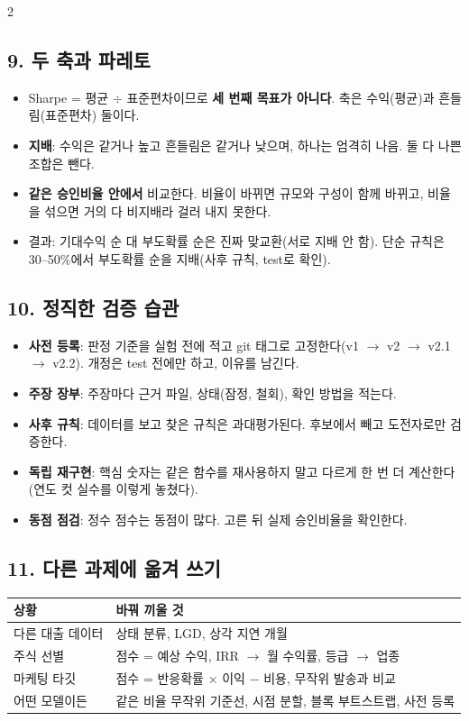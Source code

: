 \documentclass[10pt]{report}
\begin{document}
\begin{multicols}{2}
\subsection*{9. 두 축과 파레토}
\begin{itemize}
\item Sharpe = 평균 \ensuremath{\div} 표준편차이므로 \textbf{세 번째 목표가 아니다}. 축은 수익(평균)과 흔들림(표준편차) 둘이다.
\item \textbf{지배}: 수익은 같거나 높고 흔들림은 같거나 낮으며, 하나는 엄격히 나음. 둘 다 나쁜 조합은 뺀다.
\item \textbf{같은 승인비율 안에서} 비교한다. 비율이 바뀌면 규모와 구성이 함께 바뀌고, 비율을 섞으면 거의 다 비지배라 걸러 내지 못한다.
\item 결과: 기대수익 순 대 부도확률 순은 진짜 맞교환(서로 지배 안 함). 단순 규칙은 30--50\%에서 부도확률 순을 지배(사후 규칙, test로 확인).
\end{itemize}

\subsection*{10. 정직한 검증 습관}
\begin{itemize}
\item \textbf{사전 등록}: 판정 기준을 실험 전에 적고 git 태그로 고정한다(v1 \ensuremath{\to} v2 \ensuremath{\to} v2.1 \ensuremath{\to} v2.2). 개정은 test 전에만 하고, 이유를 남긴다.
\item \textbf{주장 장부}: 주장마다 근거 파일, 상태(잠정, 철회), 확인 방법을 적는다.
\item \textbf{사후 규칙}: 데이터를 보고 찾은 규칙은 과대평가된다. 후보에서 빼고 도전자로만 검증한다.
\item \textbf{독립 재구현}: 핵심 숫자는 같은 함수를 재사용하지 말고 다르게 한 번 더 계산한다(연도 컷 실수를 이렇게 놓쳤다).
\item \textbf{동점 점검}: 정수 점수는 동점이 많다. 고른 뒤 실제 승인비율을 확인한다.
\end{itemize}

\subsection*{11. 다른 과제에 옮겨 쓰기}
\begin{tabularx}{\linewidth}{@{}p{22mm}X@{}}\toprule
상황 & 바꿔 끼울 것\\\midrule
다른 대출 데이터 & 상태 분류, LGD, 상각 지연 개월\\
주식 선별 & 점수 = 예상 수익, IRR \ensuremath{\to} 월 수익률, 등급 \ensuremath{\to} 업종\\
마케팅 타깃 & 점수 = 반응확률 \ensuremath{\times} 이익 $-$ 비용, 무작위 발송과 비교\\
어떤 모델이든 & 같은 비율 무작위 기준선, 시점 분할, 블록 부트스트랩, 사전 등록\\\bottomrule
\end{tabularx}
\end{multicols}
\end{document}
